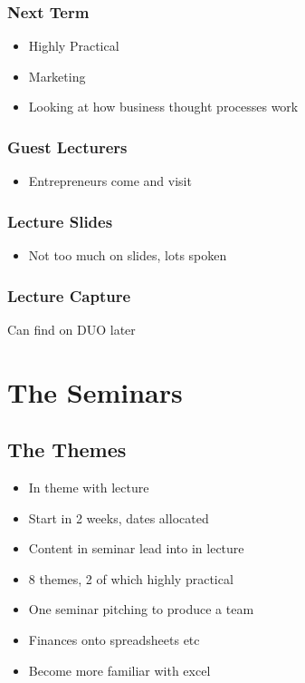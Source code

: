 \documentclass{article}[18pt]
\begin{document}
\subsubsection{Next Term}
\begin{itemize}
\item Highly Practical
\item Marketing
\item Looking at how business thought processes work
\end{itemize}
\subsubsection{Guest Lecturers}
\begin{itemize}
\item Entrepreneurs come and visit 
\end{itemize}
\subsubsection{Lecture Slides}
\begin{itemize}
\item Not too much on slides, lots spoken
\end{itemize}
\subsubsection{Lecture Capture}
Can find on DUO later

\section{The Seminars}
\subsection{The Themes}
\begin{itemize}
\item In theme with lecture
\item Start in 2 weeks, dates allocated
\item Content in seminar lead into in lecture
\item 8 themes, 2 of which highly practical
\item One seminar pitching to produce a team
\item Finances onto spreadsheets etc
\item Become more familiar with excel
\end{itemize}
\end{document}
